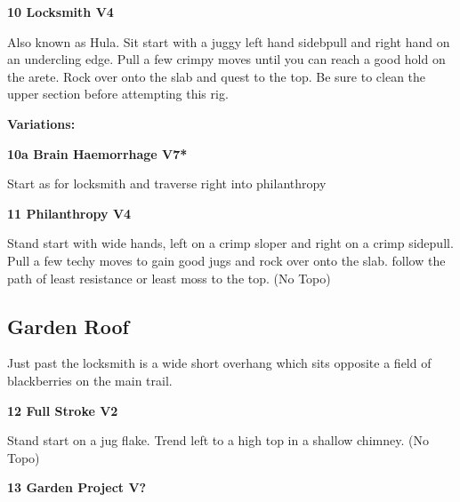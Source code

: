 \begin{multicols}{2}

					\label{rt:Locksmith}
\colorbox{RoyalBlue!20}{
\parbox{0.95\linewidth}{
\textbf{
10 Locksmith V4     \warn \warn 
}
}
}

					\begin{adjustwidth}{0.5cm}{}				
					Also known as Hula. Sit start with a juggy left hand sidebpull and right hand on an undercling edge. Pull a few crimpy moves until you can reach a good hold on the arete. Rock over onto the slab and quest to the top. Be sure to clean the upper section before attempting this rig.
					\end{adjustwidth}
						\begin{adjustwidth}{0.5cm}{}				
						\textbf{Variations:} \newline
							\label{vr:Brain Haemorrhage}
\colorbox{Goldenrod!50}{
\parbox{0.95\linewidth}{
\textbf{
10a Brain Haemorrhage V7*  
}
}
}

							\begin{adjustwidth}{0.5cm}{}				
							Start as for locksmith and traverse right into philanthropy
							\end{adjustwidth}
						\end{adjustwidth}
					\label{rt:Philanthropy}
\colorbox{RoyalBlue!20}{
\parbox{0.95\linewidth}{
\textbf{
11 Philanthropy V4   \warn \warn 
}
}
}

					\begin{adjustwidth}{0.5cm}{}				
					Stand start with wide hands, left on a crimp sloper and right on a crimp sidepull. Pull a few techy moves to gain good jugs and rock over onto the slab. follow the path of least resistance or least moss to the top.
						\newline (No Topo) 
					\end{adjustwidth}
			\subsection*{Garden Roof}\label{bf:Garden Roof}
			Just past the locksmith is a wide short overhang which sits opposite a field of blackberries on the main trail.\\
			
					\label{rt:Full Stroke}
\colorbox{green!20}{
\parbox{0.95\linewidth}{
\textbf{
12 Full Stroke V2    \warn 
}
}
}

					\begin{adjustwidth}{0.5cm}{}				
					Stand start on a jug flake. Trend left to a high top in a shallow chimney.
						\newline (No Topo) 
					\end{adjustwidth}
					\label{rt:Garden Project}
\colorbox{black!20}{
\parbox{0.95\linewidth}{
\textbf{
13 Garden Project V?  
}
}
}


\end{multicols}
